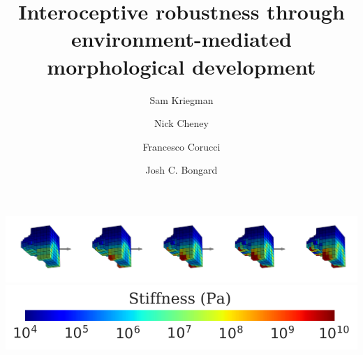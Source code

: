 \documentclass[sigconf]{acmart} %
\begin{document}
\title{Interoceptive robustness through environment-mediated morphological development}

\author{Sam Kriegman}

\author{Nick Cheney}

\author{Francesco Corucci}

\author{Josh C. Bongard}



\renewcommand{\shortauthors}{Kriegman et al.}


\begin{teaserfigure}
\centering
\vspace{-1.75em}
\includegraphics[width=\linewidth]{img/Callosities} \\
\vspace{-1.75em}
\includegraphics[width=0.35\linewidth]{img/colorbar} \\
\vspace{-1em}
\caption{A single robot grows calluses as it walks, 
in response to pressure on its feet   
(\href{https://youtu.be/0cmwpcxSUWI}{\textcolor{blue}{\textbf{\texttt{youtu.be/0cmwpcxSUWI}}}}).
} %
\label{fig:calluses}
\vspace{1em}
\end{teaserfigure}




\maketitle













\end{document}
